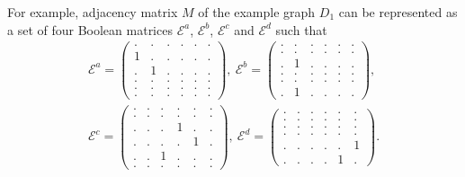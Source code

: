 For example, adjacency matrix $M$ of the example graph $D_1$ can be represented as a set of four Boolean matrices $\mathcal{E}^a$, $\mathcal{E}^b$, $\mathcal{E}^c$ and $\mathcal{E}^d$ such that 
\begin{align*}
\mathcal{E}^a =
\begin{pmatrix}
    . & . & . & . & . & .   \\
    1 & . & . & . & . & . \\
    . & 1 & . & . & . & .\\
    . & . & . & . & . & . \\ 
    . & . & . & . & . & . \\ 
    . & . & . & . & . & .
\end{pmatrix},~  
\mathcal{E}^b =
\begin{pmatrix}
    . & . & . & . & . & .   \\
    . & . & . & . & . & . \\
    . & 1 & . & . & . & .\\
    . & . & . & . & . & . \\ 
    . & . & . & . & . & . \\ 
    . & 1 & . & . & . & .
\end{pmatrix},\\
\mathcal{E}^c =
\begin{pmatrix}
    . & . & . & . & . & .   \\
    . & . & . & . & . & . \\
    . & . & . & 1 & . & .\\
    . & . & . & . & 1 & . \\ 
    . & . & 1 & . & . & . \\ 
    . & . & . & . & . & .
\end{pmatrix},~ 
\mathcal{E}^d =
\begin{pmatrix}
    . & . & . & . & . & .   \\
    . & . & . & . & . & . \\
    . & . & . & . & . & .\\
    . & . & . & . & . & . \\ 
    . & . & . & . & . & 1 \\ 
    . & . & . & . & 1 & .
\end{pmatrix}.
\label{eq:boolean_decomposition_of_graph}
\end{align*}

